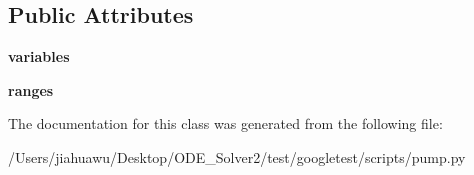 \subsection*{Public Attributes}
\begin{DoxyCompactItemize}
\item 
\mbox{\label{classpump_1_1_env_aba6456f3d0d23ac92bc9508c1b966bcd}} 
{\bfseries variables}
\item 
\mbox{\label{classpump_1_1_env_a8d5fec087c1a9108de9b105922b34309}} 
{\bfseries ranges}
\end{DoxyCompactItemize}


The documentation for this class was generated from the following file\+:\begin{DoxyCompactItemize}
\item 
/\+Users/jiahuawu/\+Desktop/\+O\+D\+E\+\_\+\+Solver2/test/googletest/scripts/pump.\+py\end{DoxyCompactItemize}
